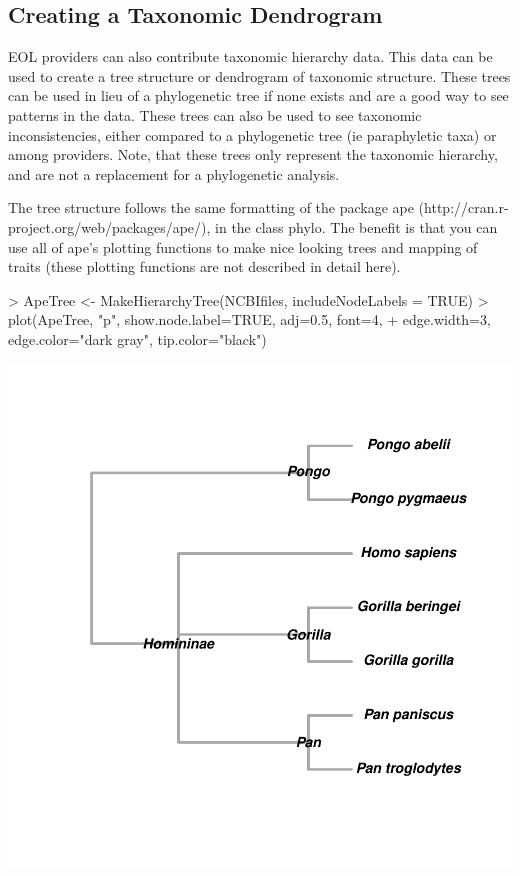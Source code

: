 \documentclass[12pt]{article}
\begin{document}
\subsection{Creating a Taxonomic Dendrogram}
EOL providers can also contribute taxonomic hierarchy data. This data can be used to create a tree structure or dendrogram of taxonomic structure. These trees can be used in lieu of a phylogenetic tree if none exists and are a good way to see patterns in the data. These trees can also be used to see taxonomic inconsistencies, either compared to a phylogenetic tree (ie paraphyletic taxa) or among providers. Note, that these trees only represent the taxonomic hierarchy, and are not a replacement for a phylogenetic analysis. 

The tree structure follows the same formatting of the package ape (http://cran.r-project.org/web/packages/ape/), in the class phylo. The benefit is that you can use all of ape's plotting functions to make nice looking trees and mapping of traits (these plotting functions are not described in detail here). 

\begin {center}
\begin{Schunk}
\begin{Sinput}
> ApeTree <- MakeHierarchyTree(NCBIfiles, includeNodeLabels = TRUE)
> plot(ApeTree, "p", show.node.label=TRUE, adj=0.5, font=4, 
+ 	edge.width=3, edge.color="dark gray", tip.color="black")
\end{Sinput}
\end{Schunk}
\includegraphics{ReolUserManual-014}
\end{center}
\end{document}
